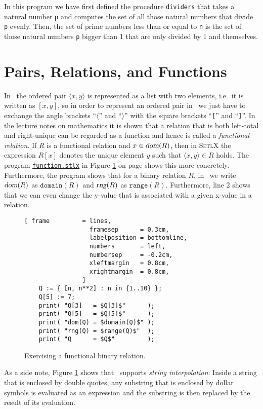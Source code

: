 In this program we have first defined the procedure \texttt{dividers} that takes a natural number
\texttt{p} and computes the set of all those natural numbers that divide \texttt{p} evenly.
Then, the set of prime numbers less than or equal to \texttt{n} is the set of those natural numbers
\texttt{p} bigger than 1 that are only divided by 1 and themselves.


\section{Pairs, Relations, and Functions}
In \setlx\ the ordered pair $\langle x, y \rangle$ is represented as a list with two elements,
i.e.~it is written as $[x,y]$, so in order to represent an ordered pair in \setlx\ we just have to
exchange the angle brackets ``$\langle$'' and ``$\rangle$'' with the square brackets ``\texttt{[}''
and ``\texttt{]}''.  In the
\href{https://github.com/karlstroetmann/Lineare-Algebra/blob/master/Script/lineare-algebra.pdf}{lecture
  notes on mathematics}  it is shown that a relation that is both left-total and 
right-unique can be regarded as a function and hence is called a \emph{functional relation}.  If $R$
is a functional relation and $x \in \textsl{dom}(R)$, then in \textsc{SetlX} the expression  $R[x]$
denotes the unique element $y$ such that $\langle x, y \rangle \in R$ holds. The program  
\href{https://github.com/karlstroetmann/Logik/blob/master/SetlX/function.stlx}{\texttt{function.stlx}}
in Figure \ref{fig:function.stlx} on page \pageref{fig:function.stlx} shows this more concretely.
Furthermore, the program shows that for a binary relation $R$, in \setlx\ we write
$\textsl{dom}(R)$ as $\texttt{domain}(R)$ and $\textsl{rng}(R)$ as $\mathtt{range}(R)$.
Furthermore, line 2 shows that we can even change the y-value that is associated with a given
x-value in a relation.


\begin{figure}[!ht]
  \centering
\begin{Verbatim}[ frame         = lines, 
                  framesep      = 0.3cm, 
                  labelposition = bottomline,
                  numbers       = left,
                  numbersep     = -0.2cm,
                  xleftmargin   = 0.8cm,
                  xrightmargin  = 0.8cm,
                ]
    Q := { [n, n**2] : n in {1..10} };
    Q[5] := 7;
    print( "Q[3]   = $Q[3]$"      );
    print( "Q[5]   = $Q[5]$"      );
    print( "dom(Q) = $domain(Q)$" );
    print( "rng(Q) = $range(Q)$"  );
    print( "Q      = $Q$"         );

\end{Verbatim} 
\vspace*{-0.3cm}
\caption{Exercising a functional binary relation.}  \label{fig:function.stlx}
\end{figure} 
As a side note, Figure \ref{fig:function.stlx} shows that \setlx\ supports \emph{string interpolation}: 
Inside a string that is enclosed by double quotes, any substring that is enclosed by dollar symbols is
evaluated as an expression and the substring is then replaced by the result of its evaluation.

